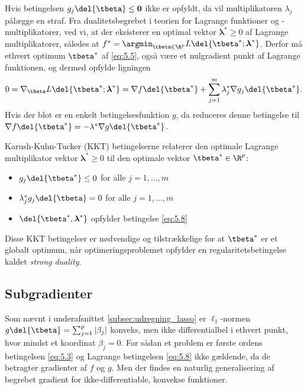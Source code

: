Hvis betingelsen \(g_j \del{\tbeta} \leq \mathbf{0}\) ikke er opfyldt, da vil multiplikatoren \(\lambda_j\) pålægge en straf.
Fra dualitetsbegrebet i teorien for Lagrange funktioner og -multiplikatorer, ved vi, at der eksisterer en optimal vektor \(\boldsymbol{\lambda}^* \geq 0\) af Lagrange multiplikatorer, således at 
\(f^* = \argmin_{\tbeta \in \R^p} L \del{\tbeta^*; \boldsymbol{\lambda}^*}\).
Derfor må ethvert optimum \(\tbeta^*\) af \eqref{eq:5.5}, også være et nulgradient punkt af Lagrange funktionen, og dermed opfylde ligningen 
\begin{align}
0 = \nabla_{\tbeta} L \del{\tbeta^*; \boldsymbol{\lambda}^*} = \nabla f \del{\tbeta^*} + \sum_{j=1}^m \lambda_j^* \nabla g_j \del{\tbeta^*}. \label{eq:5.8}
\end{align}
Hvis der blot er en enkelt betingelsesfunktion \(g\), da reduceres denne betingelse til \(\nabla f \del{\tbeta^*} = - \lambda^* \nabla g \del{\tbeta^*}\).

Karush-Kuhn-Tucker (KKT) betingelserne relaterer den optimale Lagrange multiplikator vektor \(\boldsymbol{\lambda}^* \geq 0\) til den optimale vektor \(\tbeta^* \in \R^p\):
\begin{itemize}
\item \(g_j \del{\tbeta^*} \leq 0\) for alle \(j = 1, \ldots, m\)
\item \(\lambda_j^* g_j \del{\tbeta} = 0\) for alle \(j = 1, \ldots, m\)
\item \(\del{\tbeta^*, \boldsymbol{\lambda}^*}\) opfylder betingelse \eqref{eq:5.8}
\end{itemize}
Disse KKT betingelser er nødvendige og tilstrækkelige for at \(\tbeta^*\) er et globalt optimum, når optimeringsproblemet opfylder en regularitetsbetingelse kaldet \textit{strong duality}.
%
\subsection{Subgradienter}
Som nævnt i underafsnittet \ref{subsec:udregning_lasso} er \(\ell_1\)-normen \(g \del{\tbeta} = \sum_{j=1}^p \vert \beta_j \vert\) konveks, men ikke differentialbel i ethvert punkt, hvor mindst et koordinat \(\beta_j = 0\).
For sådan et problem er første ordens betingelsen \eqref{eq:5.3} og Lagrange betingelsen \eqref{eq:5.8} ikke gældende, da de betragter gradienter af \(f\) og \(g\).
Men der findes en naturlig generalisering af begrebet gradient for ikke-differentiable, konvekse funktioner.

